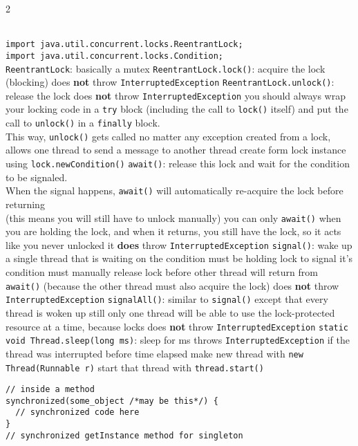 \documentclass{article}
\def \columncount {2}
\newcommand{\codesize}{8.5}
\newcommand{\java}[1]{{\fontsize{\codesize}{\codesize}\selectfont\texttt{#1}}}
\begin{document}
\begin{multicols*}{\columncount}
\begin{outline}[longenum]
\\\java{import java.util.concurrent.locks.ReentrantLock;}
\\\java{import java.util.concurrent.locks.Condition;}
\\\zzz{\java{ReentrantLock}}
  \1 \java{ReentrantLock}: basically a mutex
  \1 \java{ReentrantLock.lock()}: acquire the lock (blocking)
    \2 does \textbf{not} throw \java{InterruptedException}
  \1 \java{ReentrantLock.unlock()}: release the lock
    \2 does \textbf{not} throw \java{InterruptedException}
    \2 you should always wrap your locking code in a \java{try{}} block (including the call to \java{lock()} itself) and put the call to \java{unlock()} in a \java{finally{}} block.
    \\This way, \java{unlock()} gets called no matter any exception
\zzz{\java{Condition}}
  \1 created from a lock, allows one thread to send a message to another thread
    \2 create form lock instance using \java{lock.newCondition()}
  \1 \java{await()}: release this lock and wait for the condition to be signaled.
    \\ When the signal happens, \java{await()} will automatically re-acquire the lock before returning
    \\ (this means you will still have to unlock manually)
    \2 you can only \java{await()} when you are holding the lock, and when it returns, you still have the lock, so it acts like you never unlocked it
    \2 \textbf{does} throw \java{InterruptedException}
  \1 \java{signal()}: wake up a single thread that is waiting on the condition
    \2 must be holding lock to signal it's condition
    \2 must manually release lock before other thread will return from \java{await()} (because the other thread must also acquire the lock)
    \2 does \textbf{not} throw \java{InterruptedException}
  \1 \java{signalAll()}: similar to \java{signal()} except that every thread is woken up
    \2 still only one thread will be able to use the lock-protected resource at a time, because locks
    \2 does \textbf{not} throw \java{InterruptedException}
  \1 \java{static void Thread.sleep(long ms)}: sleep for ms
    \2 throws \java{InterruptedException} if the thread was interrupted before time elapsed
  \1 make new thread with \java{new Thread(Runnable r)}
    \2 start that thread with \java{thread.start()}
\zzz{\java{synchronized}}
\begin{verbatim}
// inside a method
synchronized(some_object /*may be this*/) {
  // synchronized code here
}
// synchronized getInstance method for singleton

\end{verbatim}
\end{outline}
\end{multicols*}
\end{document}
